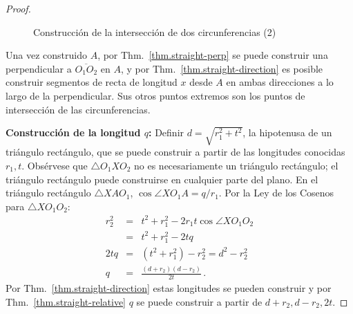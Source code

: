 {\begin{proof}
\begin{figure}[b]
\begin{center}
\end{center}
\caption{Construcción de la intersección de dos circunferencias (2)}\label{f.se-circle-circle2}
\end{figure}

Una vez construido $A$, por Thm.~\ref{thm.straight-perp} se puede construir una perpendicular a $\overline{O_1O_2}$ en $A$, y por Thm.~\ref{thm.straight-direction} es posible construir segmentos de recta de longitud $x$ desde $A$ en ambas direcciones a lo largo de la perpendicular. Sus otros puntos extremos son los puntos de intersección de las circunferencias.

\noindent\textbf{Construcción de la longitud $q$:} Definir $d=\sqrt{r_1^2+t^2}$, la hipotenusa de un triángulo rectángulo, que se puede construir a partir de las longitudes conocidas $r_1,t$. Obsérvese que $\triangle O_1XO_2$ no es necesariamente un triángulo rectángulo; el triángulo rectángulo puede construirse en cualquier parte del plano. En el triángulo rectángulo $\triangle XAO_1$, $\cos\angle XO_1A=q/r_1$. Por la Ley de los Cosenos para $\triangle XO_1O_2$:
\begin{eqnarray*}
r_2^2 &=& t^2 + r_1^2 - 2r_1t\cos\angle XO_1O_2\\
&=& t^2 + r_1^2 - 2tq\\
2tq &=& (t^2+r_1^2) - r_2^2=d^2-r_2^2\\
q&=&\frac{(d+r_2)(d-r_2)}{2t}\,.
\end{eqnarray*}
Por Thm.~\ref{thm.straight-direction} estas longitudes se pueden construir y por Thm.~\ref{thm.straight-relative} $q$ se puede construir a partir de $d+r_2,d-r_2,2t$.


\end{proof}}
